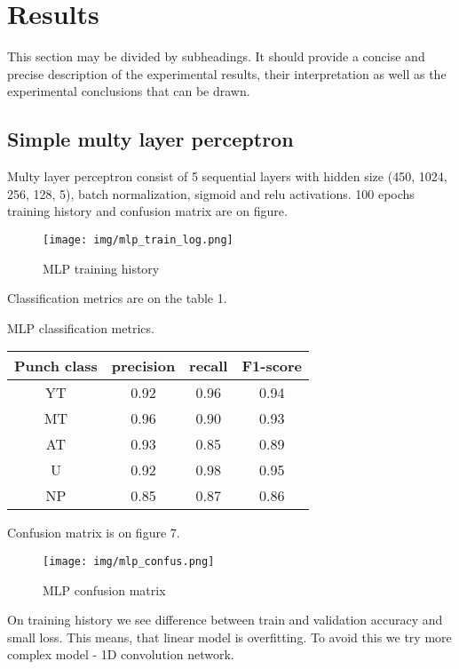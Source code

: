 \documentclass[sport,article,submit,moreauthors,pdftex]{Definitions/mdpi}
\begin{document}

\section{Results}

This section may be divided by subheadings. It should provide a concise and precise description of the experimental results, their interpretation as well as the experimental conclusions that can be drawn.


\subsection{Simple multy layer perceptron}
Multy layer perceptron consist of 5 sequential layers with hidden size (450, 1024, 256, 128, 5), batch normalization, sigmoid and relu activations.
100 epochs training history and confusion matrix are on figure.


\begin{figure}[H]
\texttt{[image: img/mlp\_train\_log.png]}
\caption{MLP training history}
\end{figure} 

Classification metrics are on the table 1.

\begin{specialtable}[H] 
\caption{MLP classification metrics.}
\label{tab1}
\begin{tabular}{cccc}
\toprule
\textbf{Punch class}	& \textbf{precision}	& \textbf{recall}	& \textbf{F1-score}\\
\midrule
YT		& 0.92		& 0.96		& 0.94\\
MT		& 0.96		& 0.90		& 0.93\\
AT		& 0.93		& 0.85		& 0.89\\
U		& 0.92		& 0.98		& 0.95\\
NP		& 0.85		& 0.87		& 0.86\\
\bottomrule
\end{tabular}
\end{specialtable}

Confusion matrix is on figure 7.

\begin{figure}[H]
\texttt{[image: img/mlp\_confus.png]}
\caption{MLP confusion matrix}
\end{figure} 


On training history we see difference between train and validation accuracy and small loss.
This means, that linear model is overfitting.
To avoid this we try more complex model - 1D convolution network.
\end{document}
